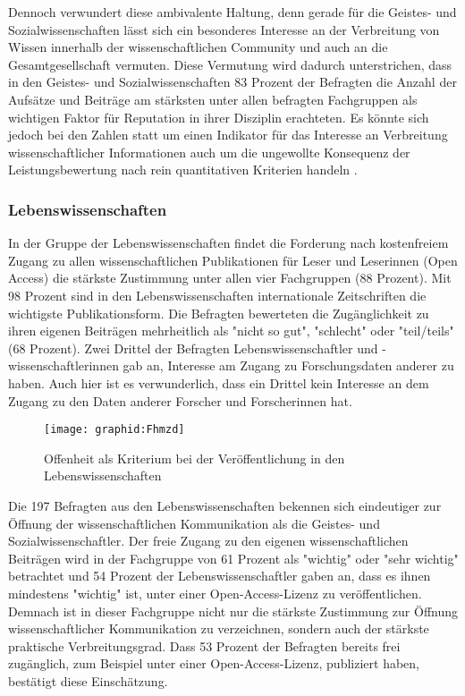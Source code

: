Dennoch verwundert diese ambivalente Haltung, denn gerade für die Geistes- und Sozialwissenschaften lässt sich ein besonderes Interesse an der Verbreitung von Wissen innerhalb der wissenschaftlichen Community und auch an die Gesamtgesellschaft vermuten. Diese Vermutung wird dadurch unterstrichen, dass in den Geistes- und Sozialwissenschaften 83 Prozent der Befragten die Anzahl der Aufsätze und Beiträge am stärksten unter allen befragten Fachgruppen als wichtigen Faktor für Reputation in ihrer Disziplin erachteten. Es könnte sich jedoch bei den Zahlen statt um einen Indikator für das Interesse an Verbreitung wissenschaftlicher Informationen auch um die ungewollte Konsequenz der Leistungsbewertung nach rein quantitativen Kriterien handeln \cite{wr_2015_wissenschaft_integritaet}.

\subsubsection{Lebenswissenschaften}

In der Gruppe der Lebenswissenschaften findet die Forderung nach kostenfreiem Zugang zu allen wissenschaftlichen Publikationen für Leser und Leserinnen (Open Access) die stärkste Zustimmung unter allen vier Fachgruppen (88 Prozent). Mit 98 Prozent sind in den Lebenswissenschaften internationale Zeitschriften die wichtigste Publikationsform. Die Befragten bewerteten die Zugänglichkeit zu ihren eigenen Beiträgen mehrheitlich als "nicht so gut", "schlecht" oder "teil/teils" (68 Prozent). Zwei Drittel der Befragten Lebenswissenschaftler und -wissenschaftlerinnen gab an, Interesse am Zugang zu Forschungsdaten anderer zu haben. Auch hier ist es verwunderlich, dass ein Drittel kein Interesse an dem Zugang zu den Daten anderer Forscher und Forscherinnen hat.

\begin{figure}[h!]
\texttt{[image: graphid:Fhmzd]}
\caption{Offenheit als Kriterium bei der Veröffentlichung in den Lebenswissenschaften}
\end{figure}

Die 197 Befragten aus den Lebenswissenschaften bekennen sich eindeutiger zur Öffnung der wissenschaftlichen Kommunikation als die Geistes- und Sozialwissenschaftler. Der freie Zugang zu den eigenen wissenschaftlichen Beiträgen wird in der Fachgruppe von 61 Prozent als "wichtig" oder "sehr wichtig" betrachtet und 54 Prozent der Lebenswissenschaftler gaben an, dass es ihnen mindestens "wichtig" ist, unter einer Open-Access-Lizenz zu veröffentlichen. Demnach ist in dieser Fachgruppe nicht nur die stärkste Zustimmung zur Öffnung wissenschaftlicher Kommunikation zu verzeichnen, sondern auch der stärkste praktische Verbreitungsgrad. Dass 53 Prozent der Befragten bereits frei zugänglich, zum Beispiel unter einer Open-Access-Lizenz, publiziert haben, bestätigt diese Einschätzung.


